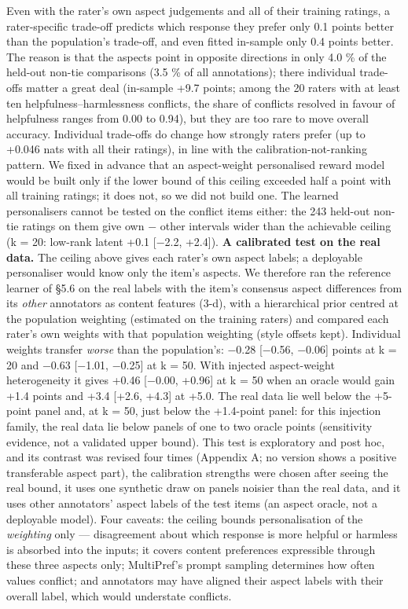 \documentclass{article}
\begin{document}
Even with the rater's own aspect judgements and all of their training ratings, a rater-specific trade-off predicts which response they prefer only 0.1 points better than the population's trade-off, and even fitted in-sample only 0.4 points better. The reason is that the aspects point in opposite directions in only 4.0 \% of the held-out non-tie comparisons (3.5 \% of all annotations); there individual trade-offs matter a great deal (in-sample +9.7 points; among the 20 raters with at least ten helpfulness--harmlessness conflicts, the share of conflicts resolved in favour of helpfulness ranges from 0.00 to 0.94), but they are too rare to move overall accuracy. Individual trade-offs do change how strongly raters prefer (up to +0.046 nats with all their ratings), in line with the calibration-not-ranking pattern. We fixed in advance that an aspect-weight personalised reward model would be built only if the lower bound of this ceiling exceeded half a point with all training ratings; it does not, so we did not build one. The learned personalisers cannot be tested on the conflict items either: the 243 held-out non-tie ratings on them give own $-$ other intervals wider than the achievable ceiling (k = 20: low-rank latent +0.1 {[}$-$2.2, +2.4{]}). \textbf{A calibrated test on the real data.} The ceiling above gives each rater's own aspect labels; a deployable personaliser would know only the item's aspects. We therefore ran the reference learner of \S{}5.6 on the real labels with the item's consensus aspect differences from its \emph{other} annotators as content features (3-d), with a hierarchical prior centred at the population weighting (estimated on the training raters) and compared each rater's own weights with that population weighting (style offsets kept). Individual weights transfer \emph{worse} than the population's: $-$0.28 {[}$-$0.56, $-$0.06{]} points at k = 20 and $-$0.63 {[}$-$1.01, $-$0.25{]} at k = 50. With injected aspect-weight heterogeneity it gives +0.46 {[}$-$0.00, +0.96{]} at k = 50 when an oracle would gain +1.4 points and +3.4 {[}+2.6, +4.3{]} at +5.0. The real data lie well below the +5-point panel and, at k = 50, just below the +1.4-point panel: for this injection family, the real data lie below panels of one to two oracle points (sensitivity evidence, not a validated upper bound). This test is exploratory and post hoc, and its contrast was revised four times (Appendix A; no version shows a positive transferable aspect part), the calibration strengths were chosen after seeing the real bound, it uses one synthetic draw on panels noisier than the real data, and it uses other annotators' aspect labels of the test items (an aspect oracle, not a deployable model). Four caveats: the ceiling bounds personalisation of the \emph{weighting} only --- disagreement about which response is more helpful or harmless is absorbed into the inputs; it covers content preferences expressible through these three aspects only; MultiPref's prompt sampling determines how often values conflict; and annotators may have aligned their aspect labels with their overall label, which would understate conflicts.
\end{document}

